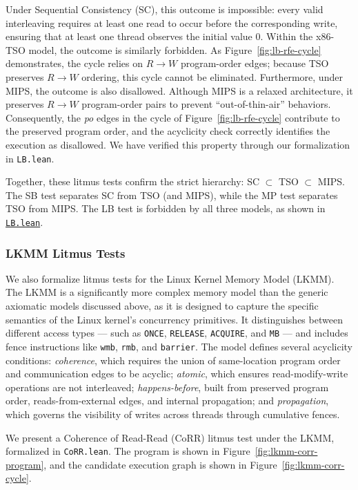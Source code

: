Under Sequential Consistency (SC), this outcome is impossible: every valid interleaving requires at least one read to occur before the corresponding write, ensuring that at least one thread observes the initial value 0. Within the x86-TSO model, the outcome is similarly forbidden. As Figure~\ref{fig:lb-rfe-cycle} demonstrates, the cycle relies on $R \to W$ program-order edges; because TSO preserves $R \to W$ ordering, this cycle cannot be eliminated. Furthermore, under MIPS, the outcome is also disallowed. Although MIPS is a relaxed architecture, it preserves $R \to W$ program-order pairs to prevent ``out-of-thin-air'' behaviors. Consequently, the \textit{po} edges in the cycle of Figure~\ref{fig:lb-rfe-cycle} contribute to the preserved program order, and the acyclicity check correctly identifies the execution as disallowed. We have verified this property through our formalization in \texttt{LB.lean}.

Together, these litmus tests confirm the strict hierarchy: SC $\subset$ TSO $\subset$ MIPS. The SB test separates SC from TSO (and MIPS), while the MP test separates TSO from MIPS. The LB test is forbidden by all three models, as shown in \href{https://github.com/nek0las/lean-cats/blob/main/LeanCats/Linux/LB.lean}{\texttt{LB.lean}}.

\subsubsection{LKMM Litmus Tests}

We also formalize litmus tests for the Linux Kernel Memory Model (LKMM). The LKMM is a significantly more complex memory model than the generic axiomatic models discussed above, as it is designed to capture the specific semantics of the Linux kernel's concurrency primitives. It distinguishes between different access types --- such as \texttt{ONCE}, \texttt{RELEASE}, \texttt{ACQUIRE}, and \texttt{MB} --- and includes fence instructions like \texttt{wmb}, \texttt{rmb}, and \texttt{barrier}. The model defines several acyclicity conditions: \emph{coherence}, which requires the union of same-location program order and communication edges to be acyclic; \emph{atomic}, which ensures read-modify-write operations are not interleaved; \emph{happens-before}, built from preserved program order, reads-from-external edges, and internal propagation; and \emph{propagation}, which governs the visibility of writes across threads through cumulative fences.

We present a Coherence of Read-Read (CoRR) litmus test under the LKMM, formalized in \texttt{CoRR.lean}. The program is shown in Figure~\ref{fig:lkmm-corr-program}, and the candidate execution graph is shown in Figure~\ref{fig:lkmm-corr-cycle}.


